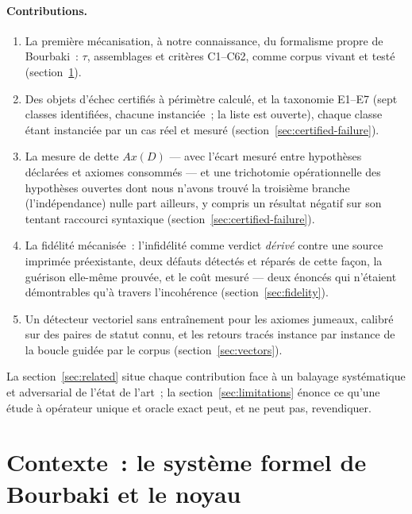 \documentclass[11pt]{article}
\theoremstyle{remark}\newtheorem{example}{Exemple}
\begin{document}
\paragraph{Contributions.}
\begin{enumerate}
  \item La première mécanisation, à notre connaissance, du formalisme propre de
        Bourbaki~: $\tau$, assemblages et critères C1--C62, comme corpus vivant et
        testé (section~\ref{sec:background}).
  \item Des objets d'échec certifiés à périmètre calculé, et la taxonomie E1--E7
        (sept classes identifiées, chacune instanciée~; la liste est ouverte),
        chaque classe étant instanciée par un cas réel et mesuré
        (section~\ref{sec:certified-failure}).
  \item La mesure de dette $Ax(D)$ --- avec l'écart mesuré entre hypothèses déclarées
        et axiomes consommés --- et une trichotomie opérationnelle des hypothèses
        ouvertes dont nous n'avons trouvé la troisième branche (l'indépendance) nulle
        part ailleurs, y compris un résultat négatif sur son tentant raccourci
        syntaxique (section~\ref{sec:certified-failure}).
  \item La fidélité mécanisée~: l'infidélité comme verdict \emph{dérivé} contre une
        source imprimée préexistante, deux défauts détectés et réparés de cette façon,
        la guérison elle-même prouvée, et le coût mesuré --- deux énoncés qui n'étaient
        démontrables qu'à travers l'incohérence (section~\ref{sec:fidelity}).
  \item Un détecteur vectoriel sans entraînement pour les axiomes jumeaux, calibré sur
        des paires de statut connu, et les retours tracés instance par instance de la
        boucle guidée par le corpus (section~\ref{sec:vectors}).
\end{enumerate}

La section~\ref{sec:related} situe chaque contribution face à un balayage systématique
et adversarial de l'état de l'art~; la section~\ref{sec:limitations} énonce ce qu'une
étude à opérateur unique et oracle exact peut, et ne peut pas, revendiquer.

\section{Contexte~: le système formel de Bourbaki et le noyau}
\label{sec:background}
\end{document}
